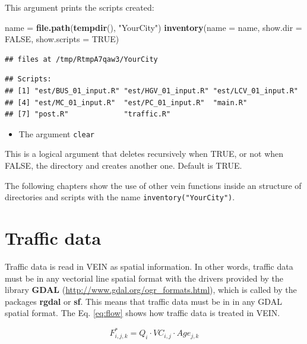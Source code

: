 \documentclass[12pt,graybox,envcountchap,sectrefs]{krantz}
\makeatletter
\newenvironment{Shaded}{\begin{snugshade}}{\end{snugshade}}
\newcommand{\KeywordTok}[1]{\textcolor[rgb]{0.13,0.29,0.53}{\textbf{#1}}}
\newcommand{\DataTypeTok}[1]{\textcolor[rgb]{0.13,0.29,0.53}{#1}}
\newcommand{\StringTok}[1]{\textcolor[rgb]{0.31,0.60,0.02}{#1}}
\newcommand{\OtherTok}[1]{\textcolor[rgb]{0.56,0.35,0.01}{#1}}
\newcommand{\NormalTok}[1]{#1}
\providecommand{\tightlist}{%
  \setlength{\itemsep}{0pt}\setlength{\parskip}{0pt}}
\newenvironment{kframe}{%
\medskip{}
\setlength{\fboxsep}{.8em}
 \def\at@end@of@kframe{}%
 \ifinner\ifhmode%
  \def\at@end@of@kframe{\end{minipage}}%
  \begin{minipage}{\columnwidth}%
 \fi\fi%
 \def\FrameCommand##1{\hskip\@totalleftmargin \hskip-\fboxsep
 \colorbox{shadecolor}{##1}\hskip-\fboxsep
     \hskip-\linewidth \hskip-\@totalleftmargin \hskip\columnwidth}%
 \MakeFramed {\advance\hsize-\width
   \@totalleftmargin\z@ \linewidth\hsize
   \@setminipage}}%
 {\par\unskip\endMakeFramed%
 \at@end@of@kframe}
\renewenvironment{Shaded}{\begin{kframe}}{\end{kframe}}
\theoremstyle{definition}
\theoremstyle{definition}
\theoremstyle{definition}
\theoremstyle{remark}
\makeatother
\begin{document}
This argument prints the scripts created:

\begin{Shaded}
\begin{Highlighting}[]
\NormalTok{name =}\StringTok{ }\KeywordTok{file.path}\NormalTok{(}\KeywordTok{tempdir}\NormalTok{(), }\StringTok{"YourCity"}\NormalTok{)}
\KeywordTok{inventory}\NormalTok{(}\DataTypeTok{name =}\NormalTok{ name, }\DataTypeTok{show.dir =} \OtherTok{FALSE}\NormalTok{, }\DataTypeTok{show.scripts =} \OtherTok{TRUE}\NormalTok{)}
\end{Highlighting}
\end{Shaded}

\begin{verbatim}
## files at /tmp/RtmpA7qaw3/YourCity
\end{verbatim}

\begin{verbatim}
## Scripts:
## [1] "est/BUS_01_input.R" "est/HGV_01_input.R" "est/LCV_01_input.R"
## [4] "est/MC_01_input.R"  "est/PC_01_input.R"  "main.R"            
## [7] "post.R"             "traffic.R"
\end{verbatim}

\begin{itemize}
\tightlist
\item
  The argument \texttt{clear}
\end{itemize}

This is a logical argument that deletes recursively when TRUE, or not
when FALSE, the directory and creates another one. Default is TRUE.

The following chapters show the use of other vein functions inside an
structure of directories and scripts with the name
\texttt{inventory("YourCity")}.

\chapter{Traffic data}\label{traffic}

Traffic data is read in VEIN as spatial information. In other words,
traffic data must be in any vectorial line spatial format with the
drivers provided by the library \textbf{GDAL}
(\url{http://www.gdal.org/ogr_formats.html}), which is called by the
packages \textbf{rgdal} or \textbf{sf}. This means that traffic data
must be in in any GDAL spatial format. The Eq. \eqref{eq:flow} shows how
traffic data is treated in VEIN.

\begin{equation}
F^*_{i,j,k} = Q_{i} \cdot VC_{i,j} \cdot Age_{j,k}
\label{eq:flow}
\end{equation}
\end{document}
